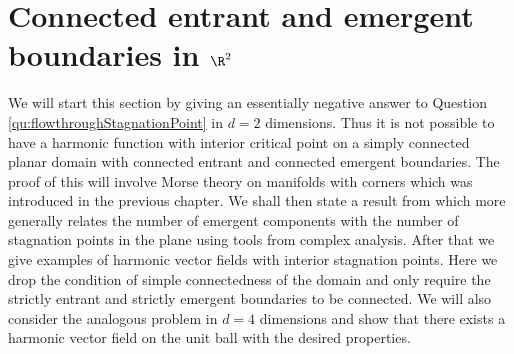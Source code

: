 
\chapter{Connected entrant and emergent boundaries in $\R^2$}

We will start this section by giving an essentially negative answer to Question \ref{qu:flowthroughStagnationPoint}
in $d=2$ dimensions. Thus it is not possible to have a harmonic function with interior critical point on a simply connected
planar domain with connected entrant and connected emergent boundaries. The proof of this will involve Morse theory on manifolds with corners which was
introduced in the previous chapter.
We shall then state a result from \cite{Alessandrini1992} which more generally relates the number of emergent components with the number
of stagnation points in the plane using tools from complex analysis. 
After that we give examples of harmonic vector fields with interior stagnation points. Here we drop the condition of simple connectedness of the domain and only require the strictly entrant and strictly emergent boundaries to be connected.
We will also consider the analogous problem in $d=4$ dimensions and show that there exists a harmonic vector field on the unit ball with the
desired properties.


